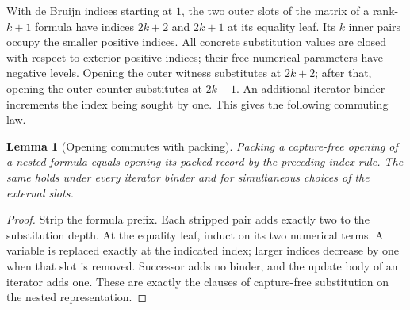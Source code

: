 \documentclass[11pt]{article}
\newtheorem{lemma}[theorem]{Lemma}
\theoremstyle{definition}\newtheorem{definition}[theorem]{Definition}
\theoremstyle{remark}\newtheorem{remark}[theorem]{Remark}
\begin{document}
With de Bruijn indices starting at $1$, the two outer slots of the matrix
of a rank-$k+1$ formula have indices $2k+2$ and $2k+1$ at its equality
leaf. Its $k$ inner pairs occupy the smaller positive indices. All concrete substitution values are closed with respect to exterior
positive indices; their free numerical parameters have negative levels.
Opening
the outer witness substitutes at $2k+2$; after that, opening the outer
counter substitutes at $2k+1$. An additional iterator binder increments
the index being sought by one. This gives the following commuting law.

\begin{lemma}[Opening commutes with packing]
Packing a capture-free opening of a nested formula equals opening its
packed record by the preceding index rule. The same holds under every
iterator binder and for simultaneous choices of the external slots.
\end{lemma}
\begin{proof}
Strip the formula prefix. Each stripped pair adds exactly two to the
substitution depth. At the equality leaf, induct on its two numerical
terms. A variable is replaced exactly at the indicated index; larger
indices decrease by one when that slot is removed. Successor adds no
binder, and the update body of an iterator adds one. These are exactly
the clauses of capture-free substitution on the nested representation.
\end{proof}
\end{document}
